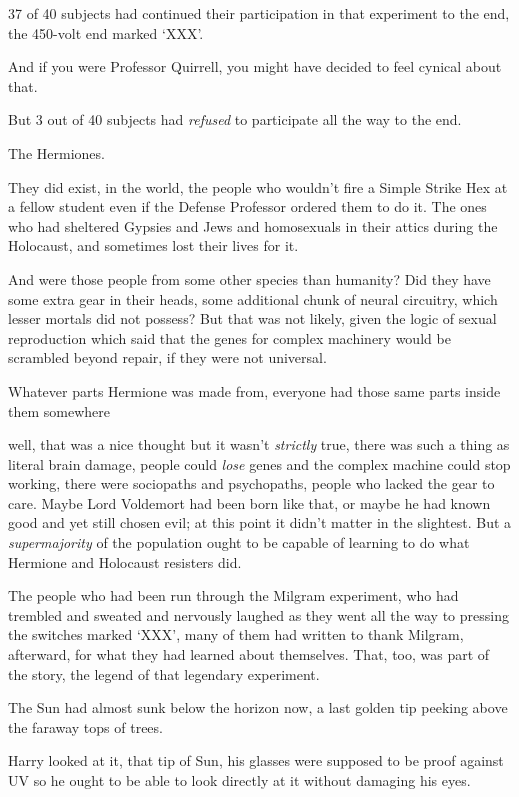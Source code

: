 37 of 40 subjects had continued their participation in that experiment to the
end, the 450-volt end marked `XXX'.

And if you were Professor Quirrell, you might have decided to feel cynical
about that.

But 3 out of 40 subjects had \emph{refused} to participate all the way to the
end.

The Hermiones.

They did exist, in the world, the people who wouldn't fire a Simple Strike Hex
at a fellow student even if the Defense Professor ordered them to do it. The
ones who had sheltered Gypsies and Jews and homosexuals in their attics during
the Holocaust, and sometimes lost their lives for it.

And were those people from some other species than humanity? Did they have some
extra gear in their heads, some additional chunk of neural circuitry, which
lesser mortals did not possess? But that was not likely, given the logic of
sexual reproduction which said that the genes for complex machinery would be
scrambled beyond repair, if they were not universal.

Whatever parts Hermione was made from, everyone had those same parts inside
them somewhere{\el}

{\el} well, that was a nice thought but it wasn't \emph{strictly} true, there
was such a thing as literal brain damage, people could \emph{lose} genes and
the complex machine could stop working, there were sociopaths and psychopaths,
people who lacked the gear to care. Maybe Lord Voldemort had been born like
that, or maybe he had known good and yet still chosen evil; at this point it
didn't matter in the slightest. But a \emph{supermajority} of the population
ought to be capable of learning to do what Hermione and Holocaust resisters did.

The people who had been run through the Milgram experiment, who had trembled
and sweated and nervously laughed as they went all the way to pressing the
switches marked `XXX', many of them had written to thank Milgram, afterward,
for what they had learned about themselves. That, too, was part of the story,
the legend of that legendary experiment.

The Sun had almost sunk below the horizon now, a last golden tip peeking above
the faraway tops of trees.

Harry looked at it, that tip of Sun, his glasses were supposed to be proof
against UV so he ought to be able to look directly at it without damaging his
eyes.

